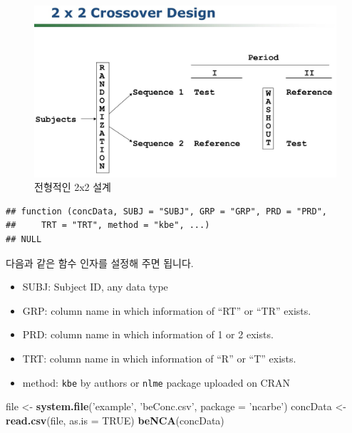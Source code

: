 \documentclass[12pt,]{krantz}
\newenvironment{Shaded}{\begin{snugshade}}{\end{snugshade}}
\newcommand{\KeywordTok}[1]{\textcolor[rgb]{0.13,0.29,0.53}{\textbf{#1}}}
\newcommand{\DataTypeTok}[1]{\textcolor[rgb]{0.13,0.29,0.53}{#1}}
\newcommand{\StringTok}[1]{\textcolor[rgb]{0.31,0.60,0.02}{#1}}
\newcommand{\OtherTok}[1]{\textcolor[rgb]{0.56,0.35,0.01}{#1}}
\newcommand{\NormalTok}[1]{#1}
\providecommand{\tightlist}{%
  \setlength{\itemsep}{0pt}\setlength{\parskip}{0pt}}
\theoremstyle{definition}
\theoremstyle{definition}
\theoremstyle{definition}
\theoremstyle{remark}
\begin{document}
\begin{figure}
\includegraphics[width=18.01in]{assets/twobytwo} \caption{전형적인 2x2 설계}\label{fig:twobytwo}
\end{figure}

\begin{verbatim}
## function (concData, SUBJ = "SUBJ", GRP = "GRP", PRD = "PRD", 
##     TRT = "TRT", method = "kbe", ...) 
## NULL
\end{verbatim}

다음과 같은 함수 인자를 설정해 주면 됩니다.

\begin{itemize}
\tightlist
\item
  SUBJ: Subject ID, any data type
\item
  GRP: column name in which information of ``RT'' or ``TR'' exists.
\item
  PRD: column name in which information of 1 or 2 exists.
\item
  TRT: column name in which information of ``R'' or ``T'' exists.
\item
  method: \texttt{kbe} by authors or \texttt{nlme} package uploaded on
  CRAN
\end{itemize}

\begin{Shaded}
\begin{Highlighting}[]
\NormalTok{file <-}\StringTok{ }\KeywordTok{system.file}\NormalTok{(}\StringTok{'example'}\NormalTok{, }\StringTok{'beConc.csv'}\NormalTok{, }\DataTypeTok{package =} \StringTok{'ncarbe'}\NormalTok{)}
\NormalTok{concData <-}\StringTok{ }\KeywordTok{read.csv}\NormalTok{(file, }\DataTypeTok{as.is =} \OtherTok{TRUE}\NormalTok{)}
\KeywordTok{beNCA}\NormalTok{(concData)}
\end{Highlighting}
\end{Shaded}
\end{document}
